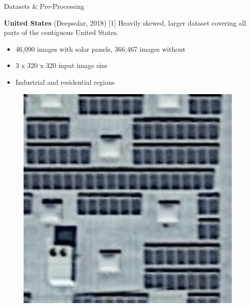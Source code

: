 \documentclass[final]{beamer}
\newlength{\colwidth}
\begin{document}
\begin{frame}[t]
\begin{columns}[t]
\begin{column}{\colwidth}
\begin{block}{\large Datasets \& Pre-Processing}
\begin{minipage}[t]{0.45\linewidth}
    
\textbf{United States} (Deepsolar, 2018) [1]
Heavily skewed, larger dataset covering all parts of the contiguous United States.
\begin{itemize}
  \item 46,090 images with solar panels, 366,467 images without
  \item 3 x 320 x 320 input image size
  \item Industrial and residential regions
\end{itemize}

\begin{figure}
\centering
\includegraphics[width=11.5cm]{img_usa.png}
\end{figure}

\end{minipage}%
\hfill%
\begin{adjustbox}
\begin{minipage}[t]{0.45\linewidth}


\end{minipage}
\end{adjustbox}
\end{block}
\end{column}
\end{columns}
\end{frame}
\end{document}
